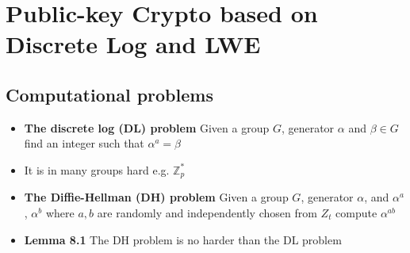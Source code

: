 \section{Public-key Crypto based on Discrete Log and LWE}


\subsection{Computational problems}
\begin{itemize}
  \item \textbf{The discrete log (DL) problem} Given a group $G$, generator $\alpha$ and $\beta \in G$ find an integer such that $\alpha^a = \beta$
	\item It is in many groups hard e.g. $\mathbb Z_p^*$
  \item \textbf{The Diffie-Hellman (DH) problem} Given a group $G$, generator $\alpha$, and $\alpha^a$, $\alpha^b$ where $a,b$ are randomly and independently chosen from $Z_t$ compute $\alpha^{ab}$
  \item \textbf{Lemma 8.1} The DH problem is no harder than the DL problem


\end{itemize}
